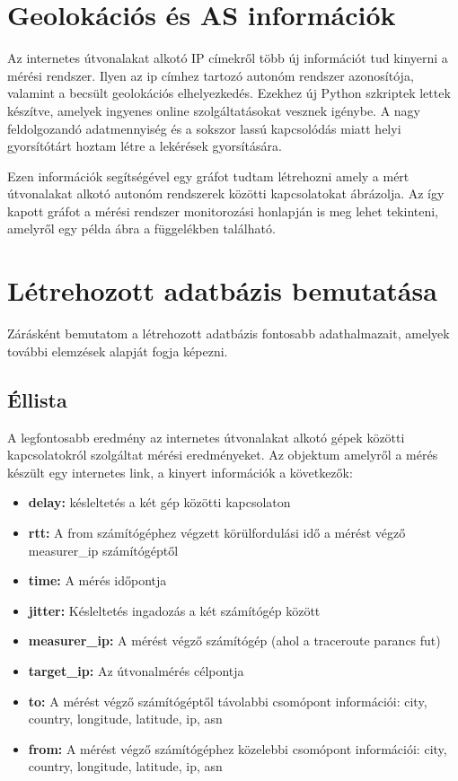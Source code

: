 
\section{Geolokációs és AS információk}
Az internetes útvonalakat alkotó IP címekről több új információt tud kinyerni a mérési rendszer. Ilyen az ip címhez tartozó autonóm rendszer azonosítója, valamint a becsült geolokációs elhelyezkedés. Ezekhez új Python szkriptek lettek készítve, amelyek ingyenes online szolgáltatásokat vesznek igénybe. A nagy feldolgozandó adatmennyiség és a sokszor lassú kapcsolódás miatt helyi gyorsítótárt hoztam létre a lekérések gyorsítására.

Ezen információk segítségével egy gráfot tudtam létrehozni amely a mért útvonalakat alkotó autonóm rendszerek közötti kapcsolatokat ábrázolja. Az így kapott gráfot a mérési rendszer monitorozási honlapján is meg lehet tekinteni, amelyről egy példa ábra a függelékben található.


\pagebreak

\section{Létrehozott adatbázis bemutatása}
Zárásként bemutatom a létrehozott adatbázis fontosabb adathalmazait, amelyek további elemzések alapját fogja képezni.

\subsection*{Éllista}
A legfontosabb eredmény az internetes útvonalakat alkotó gépek közötti kapcsolatokról szolgáltat mérési eredményeket. Az objektum amelyről a mérés készült egy internetes link, a kinyert információk a következők:

\begin{itemize}
\item \textbf{delay:} késleltetés a két gép közötti kapcsolaton
\item \textbf{rtt:} A from számítógéphez végzett körülfordulási idő a mérést végző measurer\_ip számítógéptől
\item \textbf{time:} A mérés időpontja
\item \textbf{jitter:} Késleltetés ingadozás a két számítógép között
\item \textbf{measurer\_ip:} A mérést végző számítógép (ahol a traceroute parancs fut)
\item \textbf{target\_ip:} Az útvonalmérés célpontja
\item \textbf{to:} A mérést végző számítógéptől távolabbi csomópont információi: city, country, longitude, latitude, ip, asn
\item \textbf{from:} A mérést végző számítógéphez közelebbi csomópont információi: city, country, longitude, latitude, ip, asn
\end{itemize}
\pagebreak
